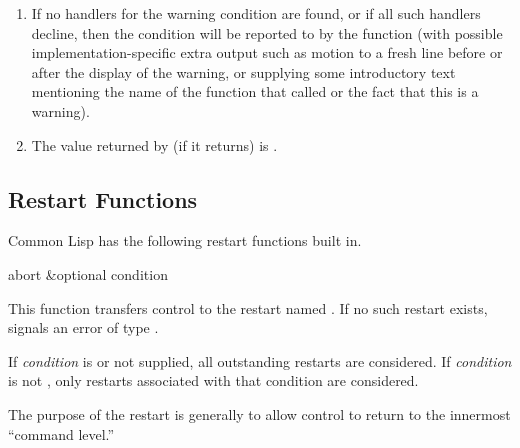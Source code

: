 \begin{defun}[Function]
\begin{enumerate}
\item If no handlers for the warning condition are found, or if all such
     handlers decline, then the condition will be reported to 
     by the  function (with possible implementation-specific extra
     output such as motion to a fresh line before or after the display
     of the warning, or supplying some introductory text mentioning
     the name of the function that called  or the fact that this
     is a warning).

\item The value returned by  (if it returns) is .
\end{enumerate}
\end{defun}

%
%
%
%
%

\subsection{Restart Functions}

Common Lisp has the following restart functions built in.

\begin{defun}[Function]
abort &optional condition

  This function transfers control to the restart named . If no such
  restart exists,  signals an error of type .

 If \emph{condition} is  or not supplied, all outstanding restarts
are considered.
If \emph{condition} is not , only restarts associated
with that condition are considered.

  The purpose of the  restart is generally to allow control to return to the
  innermost ``command level.''
\end{defun}

